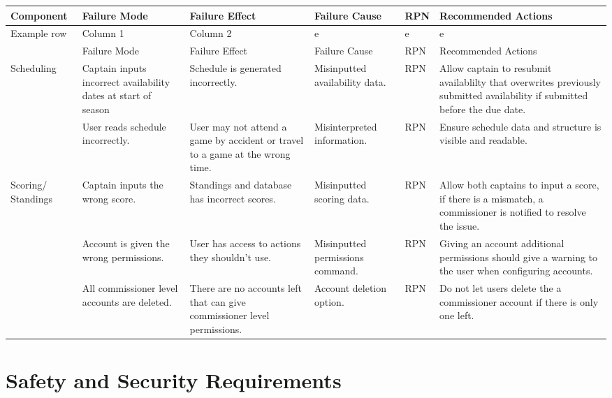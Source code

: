 \documentclass{article}
\begin{document}
\hspace*{-3.25cm}
\begin{tabularx}{504pt}{|p{2cm}||p{3cm}|p{3cm}|p{3cm}|p{1cm}|p{3cm}|}
\hline
\textbf{Component} & \textbf{Failure Mode} & \textbf{Failure Effect} & \textbf{Failure Cause} & \textbf{RPN} & \textbf{Recommended Actions}\\
\hline
\multirow{2}{2cm}{Example row} & Column 1 & Column 2 & e & e & e\\
\cline{2-6}
& Failure Mode & Failure Effect & Failure Cause & RPN & Recommended Actions\\
\hline
\multirow{2}{2cm}{Scheduling} & Captain inputs incorrect availability dates at
start of season & Schedule is generated incorrectly. & Misinputted
availability data. & RPN & Allow captain to resubmit availablilty that
overwrites previously submitted availability if submitted before the due date.
\\
\cline{2-6}
& User reads schedule incorrectly. & User may not attend a game by accident or
travel to a game at the wrong time. & Misinterpreted information. & RPN &
Ensure schedule data and structure is visible and readable.\\
\hline
\multirow{3}{2cm}{Scoring/ Standings} & Captain inputs the wrong score. & 
Standings and database has incorrect scores. & Misinputted scoring data. & RPN
& Allow both captains to input a score, if there is a mismatch, a commissioner
is notified to resolve the issue.\\
\cline{2-6}
\hline
\multirow{2}{2cm}{Accounts} & Account is given the wrong permissions. & User has access to
actions they shouldn't use. & Misinputted permissions command. & RPN & Giving
an account additional permissions should give a warning to the user when
configuring accounts.\\
\cline{2-6}
& All commissioner level accounts are deleted. & There are no
accounts left that can give commissioner level permissions. & Account deletion
option. & RPN & Do not let users delete the a commissioner account if there is
only one left.\\
\hline

\end{tabularx}



\section{Safety and Security Requirements}

\end{document}
